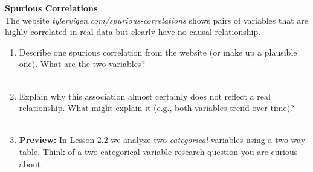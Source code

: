 \documentclass[10pt]{article}
\begin{document}
\begin{extensionbox}
\small

\textbf{Spurious Correlations}\\[4pt]
The website \textit{tylervigen.com/spurious-correlations} shows pairs of variables
that are highly correlated in real data but clearly have no causal relationship.

\vspace{5pt}
\begin{enumerate}[leftmargin=1.5em, itemsep=8pt]
  \item Describe one spurious correlation from the website (or make up a plausible one).
        What are the two variables?\\[4pt]
        \writeline\\[1pt]\writeline

  \item Explain why this association almost certainly does not reflect a real relationship.
        What might explain it (e.g., both variables trend over time)?\\[4pt]
        \writeline\\[1pt]\writeline

  \item \textbf{Preview:} In Lesson 2.2 we analyze two \emph{categorical} variables using
        a two-way table. Think of a two-categorical-variable research question you are curious about.\\[4pt]
        \writeline\\[1pt]\writeline
\end{enumerate}

\end{extensionbox}
\end{document}
